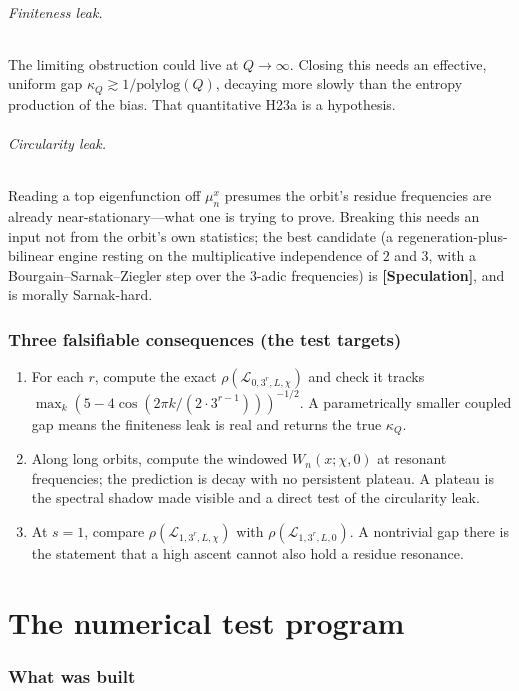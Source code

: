\documentclass[11pt]{article}
\newcommand{\Lcal}{\mathcal{L}}
\newcommand{\epi}[1]{{\small\sffamily\textbf{[#1]}}}
\theoremstyle{plain}
\theoremstyle{remark}
\begin{document}
\paragraph{Finiteness leak.} The limiting obstruction could live at
$Q\to\infty$. Closing this needs an effective, uniform gap
$\kappa_Q\gtrsim 1/\mathrm{polylog}(Q)$, decaying more slowly than the entropy
production of the bias. That quantitative \textsf{H23a} is a hypothesis.

\paragraph{Circularity leak.} Reading a top eigenfunction off $\mu_n^x$ presumes
the orbit's residue frequencies are already near-stationary---what one is trying
to prove. Breaking this needs an input not from the orbit's own statistics; the
best candidate (a regeneration-plus-bilinear engine resting on the multiplicative
independence of $2$ and $3$, with a Bourgain--Sarnak--Ziegler step over the
$3$-adic frequencies) is \epi{Speculation}, and is morally Sarnak-hard.

\section{Three falsifiable consequences (the test targets)}
\label{sec:targets}
\begin{enumerate}[leftmargin=1.6em]
\item For each $r$, compute the exact $\rho(\Lcal_{0,3^r,L,\chi})$ and check it
tracks $\max_k(5-4\cos(2\pi k/(2\cdot3^{r-1})))^{-1/2}$. A parametrically smaller
coupled gap means the finiteness leak is real and returns the true $\kappa_Q$.
\item Along long orbits, compute the windowed $W_n(x;\chi,0)$ at resonant
frequencies; the prediction is decay with no persistent plateau. A plateau is the
spectral shadow made visible and a direct test of the circularity leak.
\item At $s=1$, compare $\rho(\Lcal_{1,3^r,L,\chi})$ with
$\rho(\Lcal_{1,3^r,L,0})$. A nontrivial gap there is the statement that a high
ascent cannot also hold a residue resonance.
\end{enumerate}

\part{The numerical test program}

\section{What was built}
\end{document}
